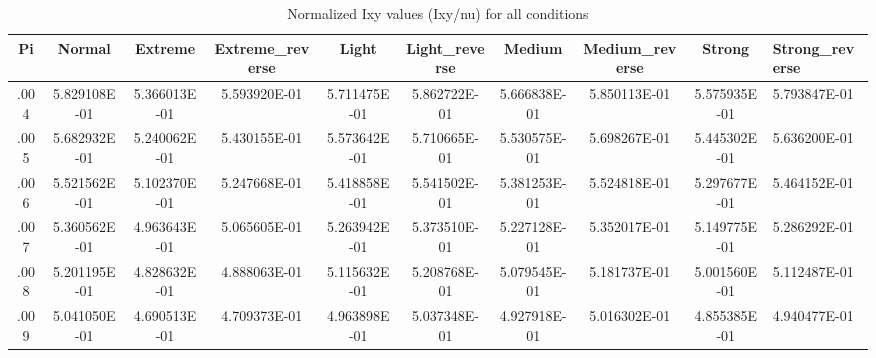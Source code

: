 \begin{table}[htbp]
\centering
\caption{Normalized Ixy values (Ixy/nu) for all conditions}
\begin{tabular}{|c|cccccccc|}
\hline
Pi & Normal & Extreme & Extreme\_reverse & Light & Light\_reverse & Medium & Medium\_reverse & Strong & Strong\_reverse \\
\hline
.004 & 5.829108E-01 & 5.366013E-01 & 5.593920E-01 & 5.711475E-01 & 5.862722E-01 & 5.666838E-01 & 5.850113E-01 & 5.575935E-01 & 5.793847E-01 \\
.005 & 5.682932E-01 & 5.240062E-01 & 5.430155E-01 & 5.573642E-01 & 5.710665E-01 & 5.530575E-01 & 5.698267E-01 & 5.445302E-01 & 5.636200E-01 \\
.006 & 5.521562E-01 & 5.102370E-01 & 5.247668E-01 & 5.418858E-01 & 5.541502E-01 & 5.381253E-01 & 5.524818E-01 & 5.297677E-01 & 5.464152E-01 \\
.007 & 5.360562E-01 & 4.963643E-01 & 5.065605E-01 & 5.263942E-01 & 5.373510E-01 & 5.227128E-01 & 5.352017E-01 & 5.149775E-01 & 5.286292E-01 \\
.008 & 5.201195E-01 & 4.828632E-01 & 4.888063E-01 & 5.115632E-01 & 5.208768E-01 & 5.079545E-01 & 5.181737E-01 & 5.001560E-01 & 5.112487E-01 \\
.009 & 5.041050E-01 & 4.690513E-01 & 4.709373E-01 & 4.963898E-01 & 5.037348E-01 & 4.927918E-01 & 5.016302E-01 & 4.855385E-01 & 4.940477E-01 \\
\hline
\end{tabular}
\end{table}

